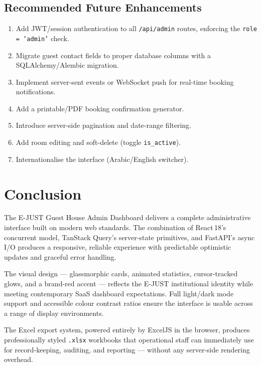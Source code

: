\documentclass[12pt,a4paper]{report}
\begin{document}
\section{Recommended Future Enhancements}

\begin{enumerate}[leftmargin=2em]
  \item Add JWT/session authentication to all \texttt{/api/admin} routes,
        enforcing the \texttt{role = 'admin'} check.
  \item Migrate guest contact fields to proper database columns with a
        SQLAlchemy/Alembic migration.
  \item Implement server-sent events or WebSocket push for real-time booking
        notifications.
  \item Add a printable/PDF booking confirmation generator.
  \item Introduce server-side pagination and date-range filtering.
  \item Add room editing and soft-delete (toggle \texttt{is\_active}).
  \item Internationalise the interface (Arabic/English switcher).
\end{enumerate}

\chapter{Conclusion}

The E-JUST Guest House Admin Dashboard delivers a complete administrative
interface built on modern web standards. The combination of React\,18's
concurrent model, TanStack Query's server-state primitives, and FastAPI's
async I/O produces a responsive, reliable experience with predictable
optimistic updates and graceful error handling.

The visual design — glassmorphic cards, animated statistics, cursor-tracked
glows, and a brand-red accent — reflects the E-JUST institutional identity
while meeting contemporary SaaS dashboard expectations. Full light/dark mode
support and accessible colour contrast ratios ensure the interface is usable
across a range of display environments.

The Excel export system, powered entirely by ExcelJS in the browser, produces
professionally styled \texttt{.xlsx} workbooks that operational staff can
immediately use for record-keeping, auditing, and reporting — without any
server-side rendering overhead.
\end{document}
